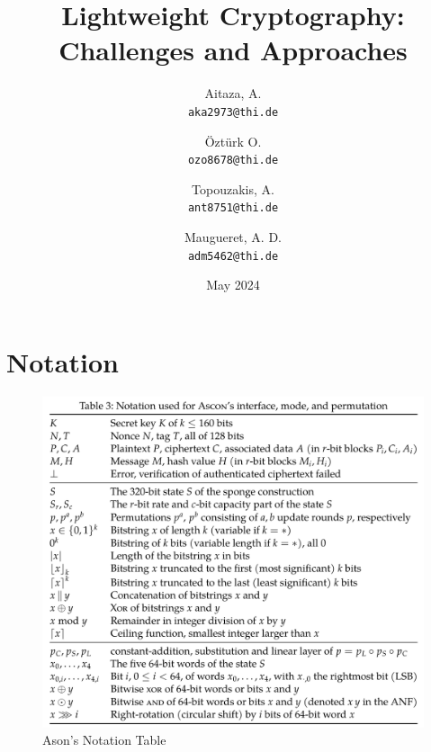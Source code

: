 \documentclass[a4paper]{article}
\date{May 2024}
\title{Lightweight Cryptography: Challenges and Approaches}
\author{
  Aitaza, A. \\
  \texttt{aka2973@thi.de}
  \and
  Öztürk O.\\
  \texttt{ozo8678@thi.de}   
  \and
  Topouzakis, A. \\
  \texttt{ant8751@thi.de}
  \and
  Maugueret, A. D.\\
  \texttt{adm5462@thi.de}
  }
\begin{document}
\maketitle

\newpage
\tableofcontents
\listoffigures
\newpage

\section{Notation}

\begin{figure}[H] 
    \centering 
    \includegraphics[width=1\textwidth]{figures/ascon-notation.png}
    \caption{Ason's Notation Table \cite{Ascon-v1.2}}
    \label{fig:ascon-notation} 
  \end{figure}








\newpage
\printbibliography
\end{document}
